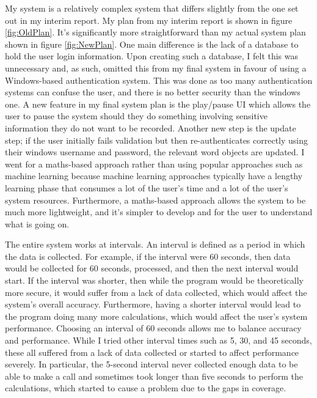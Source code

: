 \documentclass[10pt,a4paper]{report}
\begin{document}
My system is a relatively complex system that differs slightly from the one set out in my interim report. My plan from my interim report is shown in figure \ref{fig:OldPlan}. It's significantly more straightforward than my actual system plan shown in figure \ref{fig:NewPlan}. One main difference is the lack of a database to hold the user login information. Upon creating such a database, I felt this was unnecessary and, as such, omitted this from my final system in favour of using a Windows-based authentication system. This was done as too many authentication systems can confuse the user, and there is no better security than the windows one. A new feature in my final system plan is the play/pause UI which allows the user to pause the system should they do something involving sensitive information they do not want to be recorded. Another new step is the update step; if the user initially fails validation but then re-authenticates correctly using their windows username and password, the relevant word objects are updated. I went for a maths-based approach rather than using popular approaches such as machine learning because machine learning approaches typically have a lengthy learning phase that consumes a lot of the user's time and a lot of the user's system resources. Furthermore, a maths-based approach allows the system to be much more lightweight, and it's simpler to develop and for the user to understand what is going on. 

The entire system works at intervals. An interval is defined as a period in which the data is collected. For example, if the interval were 60 seconds, then data would be collected for 60 seconds, processed, and then the next interval would start. If the interval was shorter, then while the program would be theoretically more secure, it would suffer from a lack of data collected, which would affect the system's overall accuracy. Furthermore, having a shorter interval would lead to the program doing many more calculations, which would affect the user's system performance. Choosing an interval of 60 seconds allows me to balance accuracy and performance. While I tried other interval times such as 5, 30, and 45 seconds, these all suffered from a lack of data collected or started to affect performance severely. In particular, the 5-second interval never collected enough data to be able to make a call and sometimes took longer than five seconds to perform the calculations, which started to cause a problem due to the gaps in coverage. 
\end{document}
